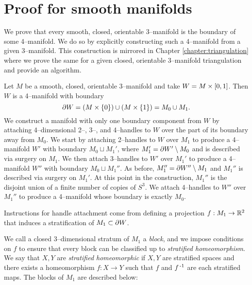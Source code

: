 \chapter{Proof for smooth manifolds}
\label{chapter:smooth}

We prove that every smooth, closed, orientable 3--manifold is the boundary of some 4--manifold.
We do so by explicitly constructing such a 4--manifold from a given 3--manifold.
This construction is mirrored in Chapter \ref{chapter:triangulation} where we prove the same for a given closed, orientable 3--manifold triangulation and provide an algorithm.

Let $M$ be a smooth, closed, orientable 3--manifold and take $W=M\times [0,1]$.
Then $W$ is a 4--manifold with boundary
\[
	\partial W = (M\times\{0\}) \cup (M\times\{1\}) = M_0 \cup M_1.
\]
We construct a manifold with only one boundary component from $W$ by attaching 4--dimensional 2--, 3--, and 4--handles to $W$ over the part of its boundary away from $M_0$.
We start by attaching 2--handles to $W$ over $M_1$ to produce a 4--manifold $W'$ with boundary $M_0 \sqcup M_1'$, where $M_1'=\partial W'\setminus M_0$ and is described via surgery on $M_1$.
We then attach 3--handles to $W'$ over $M_1'$ to produce a 4--manifold $W''$ with boundary $M_0\sqcup M_1''$.
As before, $M_1''=\partial W''\setminus M_1$ and $M_1''$ is described via surgery on $M_1'$.
At this point in the construction, $M_1''$ is the disjoint union of a finite number of copies of $S^3$.
We attach 4--handles to $W''$ over $M_1''$ to produce a 4--manifold whose boundary is exactly $M_0$.

Instructions for handle attachment come from defining a projection $f:M_1\to \mathbb{R}^2$ that induces a stratification of $M_1\subset\partial W$.

%
%
We call a closed 3--dimensional stratum of $M_1$ a \emph{block}, and we impose conditions on $f$ to ensure that every block can be classified up to \emph{stratified homeomorphism}.
We say that $X,Y$ are \emph{stratified homeomorphic} if $X,Y$ are stratified spaces and there exists a homeomorphism $f:X\to Y$ such that $f$ and $f^{\,\text{-}1}$ are each stratified maps.
The blocks of $M_1$ are described below:

